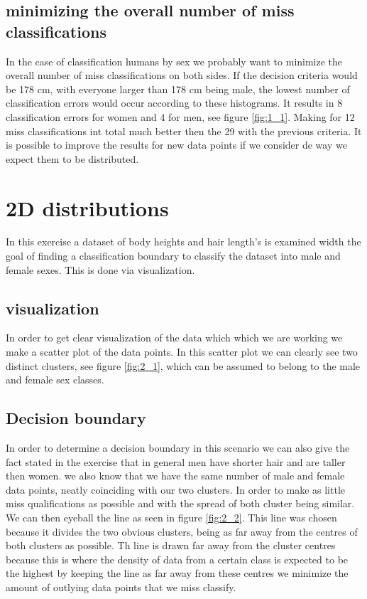 \documentclass[10pt,a4paper]{article}
\begin{document}
\subsection{minimizing the overall number of miss classifications}
In the case of classification humans by sex we probably want to minimize the overall number of miss classifications on both sides. If the decision criteria would be 178 cm, with everyone larger than 178 cm being male, the lowest number of classification errors would occur according to these histograms. It results in 8 classification errors for women and 4 for men, see figure \ref{fig:1_1}. Making for 12 miss classifications int total much better then the 29 with the previous criteria. It is possible to improve the results for new data points if we consider de way we expect them to be distributed.

\section{2D distributions}
In this exercise a dataset of body heights and hair length's is examined width the goal of finding a classification boundary to classify the dataset into male and female sexes. This is done via visualization.

\subsection{visualization}
In order to get clear visualization of the data which which we are working we make a scatter plot of the data points. In this scatter plot we can clearly see two distinct clusters, see figure \ref{fig:2_1}, which can be assumed to belong to the male and female sex classes.

\subsection{Decision boundary}
In order to determine a decision boundary in this scenario we can also give the fact stated in the exercise that in general men have shorter hair and are taller then women. we also know that we have the same number of male and female data points, neatly coinciding with our two clusters. In order to make as little miss qualifications as possible and with the spread of both cluster being similar. We can then eyeball the line as seen in figure \ref{fig:2_2}. This line was chosen because it divides the two obvious clusters, being as far away from the centres of both clusters as possible. Th line is drawn far away from the cluster centres because this is where the density of data from a certain class is expected to be the highest by keeping the line as far away from these centres we minimize the amount of outlying data points that we miss classify.
\end{document}
